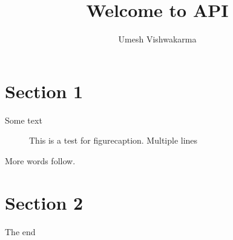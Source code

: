 \documentclass{article}
\begin{document}
\title{Welcome to API}
\author{Umesh Vishwakarma}

\maketitle

\section{Section 1}

Some text

\begin{figure}
\caption{This is a test for figurecaption.
Multiple lines}

\end{figure}

More words follow.

\section{Section 2}

The end
\end{document}
